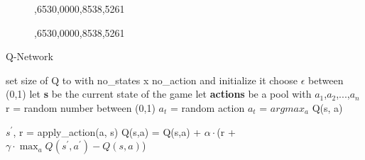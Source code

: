 \begin{figure}[hp]
  \caption{,6530,0000,8538,5261}\label{fig:sc}
\endminipage\hfill
{}%
   \caption{,6530,0000,8538,5261}\label{fig:sc}
 
\endminipage
\end{figure}


\begin{algorithm}
	\caption{Q-Network} \label{alg-code}
	\begin{algorithmic}[1]
		\State set size of Q to with no_states x no_action and initialize it
		\State choose $\epsilon$ between (0,1)
		\State let \textbf{s} be the current state of the game
		\State let \textbf{actions} be a pool with {$a_1$,$a_2$,...,$a_n$}
			\State r = random number between (0,1)
				\State $a_t$ = random action
			\Else
				\State $a_t$ = $argmax_a$ Q(s, a)
			\EndIf
			
			\State $s^\prime$, r = apply_action(a, s)
			\State Q(s,a) = Q(s,a) + $\alpha\cdot$(r + $\gamma\cdot \max_a Q(s^\prime,a^\prime)-Q(s,a)$)
		\EndWhile
	\end{algorithmic}
\end{algorithm}